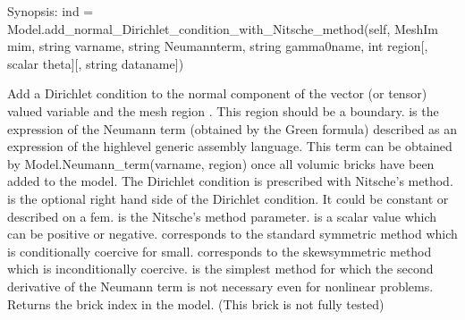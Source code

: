 \documentclass[a4paper,11pt,english]{sphinxmanual}
\begin{document}
\begin{fulllineitems}

\begin{fulllineitems}
\label{\detokenize{python/cmdref_Model:getfem.Model.add_normal_Dirichlet_condition_with_Nitsche_method}}
Synopsis: ind = Model.add\_normal\_Dirichlet\_condition\_with\_Nitsche\_method(self, MeshIm mim, string varname, string Neumannterm, string gamma0name, int region{[}, scalar theta{]}{[}, string dataname{]})

Add a Dirichlet condition to the normal component of the vector
(or tensor) valued variable  and the mesh region .
This region should be a boundary. 
is the expression of the Neumann term (obtained by the Green formula)
described as an expression of the high\sphinxhyphen{}level
generic assembly language. This term can be obtained by 
Model.Neumann\_term(varname, region) once all volumic bricks have
been added to the model. The Dirichlet
condition is prescribed with Nitsche’s method.  is the optional
right hand side of the Dirichlet condition. It could be constant or
described on a fem.  is the
Nitsche’s method parameter.  is a scalar value which can be
positive or negative.  corresponds to the standard symmetric
method which is conditionally coercive for   small.
 corresponds to the skew\sphinxhyphen{}symmetric method which is
inconditionally coercive.  is the simplest method
for which the second derivative of the Neumann term is not necessary
even for nonlinear problems. 
Returns the brick index in the model.
(This brick is not fully tested)

\end{fulllineitems}



\end{fulllineitems}
\end{document}

